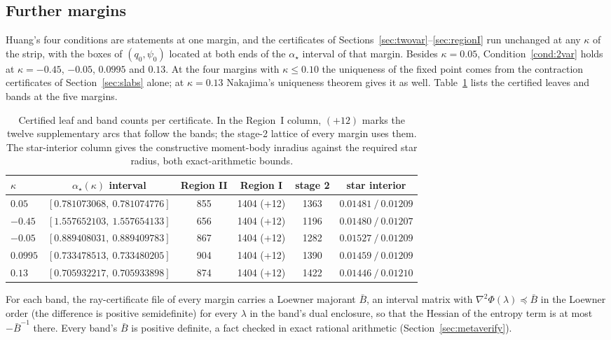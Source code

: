 \subsection{Further margins}\label{sec:margins}

Huang's four conditions are statements at one margin, and the certificates of
Sections~\ref{sec:twovar}--\ref{sec:regionI} run unchanged at any
$\kappa$ of the strip, with the boxes of $(q_0,\psi_0)$ located at
both ends of the $\alpha_\star$ interval of that margin.  Besides
$\kappa=0.05$, Condition~\ref{cond:2var} holds at $\kappa=-0.45$, $-0.05$,
$0.0995$ and $0.13$.  At the four margins with $\kappa\le0.10$ the
uniqueness of the fixed point comes from the contraction certificates
of Section~\ref{sec:slabs} alone; at $\kappa=0.13$ Nakajima's
uniqueness theorem gives it as well.  Table~\ref{tab:margins} lists the certified
leaves and bands at the five margins.

\begin{table}[tbp]
\centering
\small
\setlength{\tabcolsep}{4pt}
\begin{tabular}{lccccc}
\toprule
$\kappa$ & $\alpha_\star(\kappa)$ interval & Region II & Region I & stage 2 &
star interior \\
\midrule
$0.05$  & $[0.781073068,\ 0.781074776]$ & 855 & 1404 (+12) & 1363 &
$0.01481\ /\ 0.01209$ \\
$-0.45$ & $[1.557652103,\ 1.557654133]$ & 656 & 1404 (+12) & 1196 &
$0.01480\ /\ 0.01207$ \\
$-0.05$ & $[0.889408031,\ 0.889409783]$ & 867 & 1404 (+12) & 1282 &
$0.01527\ /\ 0.01209$ \\
$0.0995$ & $[0.733478513,\ 0.733480205]$ & 904 & 1404 (+12) & 1390 &
$0.01459\ /\ 0.01209$ \\
$0.13$  & $[0.705932217,\ 0.705933898]$ & 874 & 1404 (+12) & 1422 &
$0.01446\ /\ 0.01210$ \\
\bottomrule
\end{tabular}
\caption{Certified leaf and band counts per certificate.  In the Region~I column, $(+12)$ marks the twelve
supplementary arcs that follow the bands; the stage-2
lattice of every margin uses them.  The star-interior column gives the
constructive moment-body inradius against the required star radius,
both exact-arithmetic bounds.}
\label{tab:margins}
\end{table}

For each band, the ray-certificate file of every margin carries
a Loewner majorant $\bar B$, an interval matrix with $\nabla^2\Phi(\lambda)\preceq\bar B$ in the
Loewner order (the difference is positive semidefinite) for every
$\lambda$ in the band's dual enclosure, so that the Hessian of
the entropy term is at most $-\bar B^{-1}$ there.  Every band's $\bar B$ is
positive definite, a fact checked in exact rational arithmetic
(Section~\ref{sec:metaverify}).


